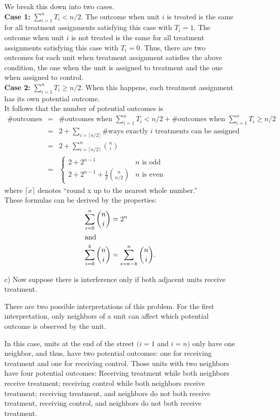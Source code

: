 \documentclass{article}
\begin{document}
\begin{itemize}
\begin{itemize}
    We break this down into two cases.\\
    \textbf{Case 1:} $\sum_{i=1}^n T_i < n/2$.  
    The outcome when unit $i$ is treated is the same for all treatment assignments satisfying this case with $T_i = 1$.
    The outcome when unit $i$ is not treated is the same for all treatment assignments satisfying this case with $T_i = 0$.
    Thus, there are two outcomes for each unit when treatment assignment satisfies the above condition,
    the one when the unit is assigned to treatment and the one when assigned to control.\\
     \textbf{Case 2:} $\sum_{i=1}^n T_i \geq n/2$.  
    When this happens, each treatment assignment has its own potential outcome. \\
    It follows that the number of potential outcomes is
    \begin{eqnarray*}
      \#\text{outcomes} &=& \#\text{outcomes when }  \sum_{i=1}^n T_i < n/2 +  \#\text{outcomes when } \sum_{i=1}^n T_i \geq n/2\\
     & = & 2 + \sum_{i = \lceil n/2 \rceil}\#\text{ways exactly $i$ treatments can be assigned}  \\
     &= & 2 + \sum_{i = \lceil n/2 \rceil}^n \binom{n}{i}\\
     & = & \left\{
       \begin{array}{ll}
         2 + 2^{n-1} & n \text{ is odd}\\
         2 + 2^{n-1} + \frac 1 2\binom{n}{n/2} & n \text{ is even}
       \end{array}
     \right.
    \end{eqnarray*}
    where $\lceil x \rceil$ denotes ``round x up to the nearest whole number.''\\
    These formulas can be derived by the properties:     
    \begin{align*}
       \sum_{i = 0}^n \binom n i &= 2^n \\ \intertext{and}
      \sum_{i = 0}^k \binom n i &= \sum_{i = n-k}^n \binom n i.
    \end{align*}
  \item[c)]
    Now suppose there is interference only if both adjacent units receive treatment.
    
    There are two possible interpretations of this problem.
    For the first interpretation, only neighbors of a unit can affect which potential
    outcome is observed by the unit.
    
    In this case, units at the end of the street $(i = 1$ and $i = n)$ only have one neighbor, and thus,
    have two potential outcomes: one for 
    receiving treatment and one for receiving control.
    Those units with two neighbors have four potential outcomes: 
    Receiving treatment while both neighbors receive treatment; 
    receiving control while both neighbors receive treatment;
    receiving treatment, and neighbors do not both receive treatment,
    receiving control, and neighbors do not both receive treatment.
    

\end{itemize}
\end{itemize}
\end{document}

